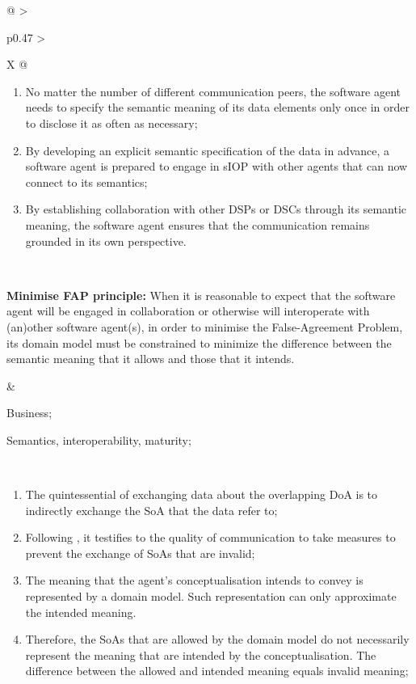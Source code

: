 \begin{xltabular}[l]{\linewidth}{@{} >{\small\raggedright\arraybackslash}p{0.47\linewidth} >{\small\raggedright\arraybackslash}X @{}}
\begin{enumerate}[left=10pt, nosep]
  \item No matter the number of different communication peers, the software agent needs to specify the semantic meaning of its data elements only once in order to disclose it as often as necessary;
  \item By developing an explicit semantic specification of the data in advance, a software agent is prepared to engage in sIOP with other agents that can now connect to its semantics;
  \item By establishing collaboration with other DSPs or DSCs through its semantic meaning, the software agent ensures that the communication remains grounded in its own perspective.
\end{enumerate} \\
%
%
%
\begin{mmdp}\label{dp:mfapp}{\bfseries Minimise FAP principle:}
\quad When it is reasonable to expect that the software agent will be engaged in collaboration or otherwise will interoperate with (an)other software agent(s), in order to minimise the False-Agreement Problem, its domain model must be constrained to minimize the difference between the semantic meaning that it allows and those that it intends.
\end{mmdp}
&
\begin{description}[labelwidth=3.7cm,leftmargin=3.7cm+1ex,nosep,topsep=2ex,labelsep=1ex,font=\bfseries]
  \item[Type of information:] Business;
  \item[Quality attributes:] Semantics, interoperability, maturity;
\end{description} \\
\begin{enumerate}[left=6pt, nosep]
  \item The quintessential of exchanging data about the overlapping DoA is to indirectly exchange the SoA that the data refer to;
  \item Following \cite{Grice:1991BT}, it testifies to the quality of communication to take measures to prevent the exchange of SoAs that are invalid;
  \item The meaning that the agent's conceptualisation intends to convey is represented by a domain model. Such representation can only approximate the intended meaning. 
  \item Therefore, the SoAs that are allowed by the domain model do not necessarily represent the meaning that are intended by the conceptualisation. The difference between the allowed and intended meaning equals invalid meaning;

\end{enumerate}
\end{xltabular}
